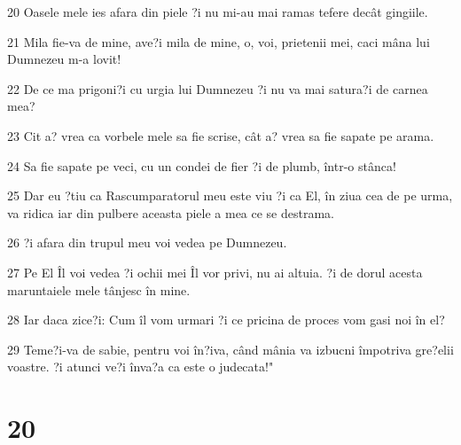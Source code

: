\par 20 Oasele mele ies afara din piele ?i nu mi-au mai ramas tefere decât gingiile.
\par 21 Mila fie-va de mine, ave?i mila de mine, o, voi, prietenii mei, caci mâna lui Dumnezeu m-a lovit!
\par 22 De ce ma prigoni?i cu urgia lui Dumnezeu ?i nu va mai satura?i de carnea mea?
\par 23 Cit a? vrea ca vorbele mele sa fie scrise, cât a? vrea sa fie sapate pe arama.
\par 24 Sa fie sapate pe veci, cu un condei de fier ?i de plumb, într-o stânca!
\par 25 Dar eu ?tiu ca Rascumparatorul meu este viu ?i ca El, în ziua cea de pe urma, va ridica iar din pulbere aceasta piele a mea ce se destrama.
\par 26 ?i afara din trupul meu voi vedea pe Dumnezeu.
\par 27 Pe El Îl voi vedea ?i ochii mei Îl vor privi, nu ai altuia. ?i de dorul acesta maruntaiele mele tânjesc în mine.
\par 28 Iar daca zice?i: Cum îl vom urmari ?i ce pricina de proces vom gasi noi în el?
\par 29 Teme?i-va de sabie, pentru voi în?iva, când mânia va izbucni împotriva gre?elii voastre. ?i atunci ve?i înva?a ca este o judecata!"

\chapter{20}

